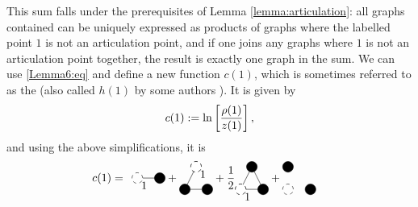 \documentclass[8.5pt,twoside,twocolumn]{article}
\theoremstyle{standard}
\begin{document}
This sum falls under the prerequisites of Lemma \ref{lemma:articulation}: all graphs contained
can be uniquely expressed as products of graphs where the labelled point $1$ is not an articulation point, 
and if one joins any graphs where $1$ is not an articulation point together, the result is 
exactly one graph in the sum. We can use \eqref{Lemma6:eq} and define a new function $c(1)$,
which is sometimes referred to as the  (also called $h(1)$ by
some authors \cite{Stell}). It is given by
\begin{equation}
c(1):=\ln\left[\frac {\rho(1)} {z(1)}\right],
\label{TopRed:cDefi}
\end{equation}
and using the above simplifications, it is
\begin{equation}
\begin{aligned}
c(1)=&
\fgbox{\begin{tikzpicture}[baseline=-.1cm]%
  \draw(0,0) node[circle,minimum size=.2cm,dashed,draw] (A) {};
  \draw(.7,0) node[circle,minimum size=.2cm,draw,fill=black] (B) {};
  \draw (A.east) --  (B.center);
  \node [below right] at (A) {1};
\end{tikzpicture}}
+
\gbox{\begin{tikzpicture}[baseline=.25cm]
  \draw(0,0) node[circle,minimum size=.2cm,draw,fill=black] (A) {};
  \draw(.7,0) node[circle,minimum size=.2cm,draw,fill=black] (B) {};
  \draw(.35,.7) node[circle,minimum size=.2cm,dashed,draw] (C) {};
  \draw (A.center) --  (B.west);
  \draw (A.center) --  (C.center);
  \draw node[circle,minimum size=.2cm,draw,fill=white,dashed,opacity=1] at (C) {};
  \node [below right] at (C) {1};
\end{tikzpicture}}
+ 
\frac 1 2
\begin{tikzpicture}[baseline=.25cm]
  \draw(0,0) node[circle,minimum size=.2cm,dashed,draw] (A) {};
  \draw(.7,0) node[circle,minimum size=.2cm,draw,fill=black] (B) {};
  \draw(.35,.7) node[circle,minimum size=.2cm,draw,fill=black] (C) {};
  \draw (A.center) --  (B.center);
  \draw (A.center) --  (C.center);
  \draw (B.center) --  (C.center);
  \draw node[circle,minimum size=.2cm,draw,dashed,fill=white,opacity=1] at (A) {};
  \node [below right] at (A) {1};
\end{tikzpicture}
 + 
 \begin{tikzpicture}[baseline=.25cm]
  \draw(0,0) node[circle,minimum size=.2cm,dashed,draw] (A) {};
  \draw(.7,0) node[circle,minimum size=.2cm,draw,fill=black] (B) {};
  \draw(0,.7) node[circle,minimum size=.2cm,draw,fill=black] (C) {};

\end{tikzpicture}
\end{aligned}
\end{equation}
\end{document}
